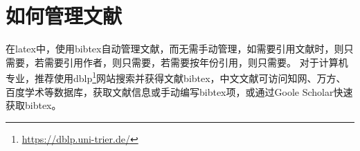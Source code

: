 \chapter{如何管理文献}

在latex中，使用bibtex自动管理文献，而无需手动管理，如需要引用文献时，则只需要\cite{kopka1995guide}，若需要引用作者，则只需要\citeauthor{DBLP:books/sp/Gliwa21}，若需要按年份引用，则只需要\citeyear{DBLP:books/sp/Gliwa21}。
对于计算机专业，推荐使用dblp\footnote{\href{https://dblp.uni-trier.de/}{\url{https://dblp.uni-trier.de/}}}网站搜索并获得文献bibtex，中文文献可访问知网、万方、百度学术等数据库，获取文献信息或手动编写bibtex项，或通过Goole Scholar快速获取bibtex。